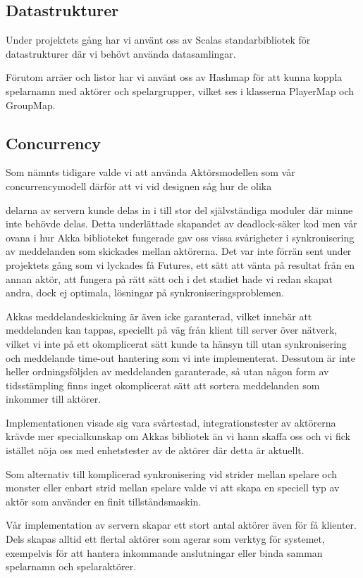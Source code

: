 \documentclass[a4paper]{article}
\begin{document}
\subsection{Datastrukturer}
Under projektets gång har vi använt oss av Scalas standarbibliotek för datastrukturer där vi behövt använda datasamlingar. 

Förutom arräer och listor har vi använt oss av Hashmap för att kunna koppla spelarnamn med aktörer och spelargrupper, vilket ses i klasserna
PlayerMap och GroupMap.

\subsection{Concurrency}
Som nämnts tidigare valde vi att använda Aktörsmodellen som vår concurrencymodell därför att vi vid designen såg hur de olika

delarna av servern kunde delas in i till stor del självständiga moduler där minne inte behövde delas. Detta underlättade
skapandet av deadlock-säker kod men vår ovana i hur Akka biblioteket fungerade gav oss vissa svårigheter i synkronisering av
meddelanden som skickades mellan aktörerna. Det var inte förrän sent under projektets gång som vi lyckades få Futures, ett sätt att 
vänta på resultat från en annan aktör, att fungera på rätt sätt och i det stadiet hade vi redan skapat andra, dock ej optimala,
lösningar på synkroniseringsproblemen. 

Akkas meddelandeskickning är även icke garanterad, vilket innebär att meddelanden kan
tappas, speciellt på väg från klient till server över nätverk, vilket vi inte på ett okomplicerat sätt kunde ta hänsyn till utan
synkronisering och meddelande time-out hantering som vi inte implementerat. Dessutom är inte heller ordningsföljden av meddelanden
garanterade, så utan någon form av tidsstämpling finns inget okomplicerat sätt att sortera meddelanden som inkommer till aktörer.

Implementationen visade sig vara svårtestad, integrationstester av aktörerna krävde mer specialkunskap om Akkas bibliotek än vi
hann skaffa oss och vi fick istället nöja oss med enhetstester av de aktörer där detta är aktuellt.

Som alternativ till komplicerad synkronisering vid strider mellan spelare och monster eller enbart strid mellan spelare valde vi att 
skapa en speciell typ av aktör som använder en finit tillståndsmaskin.

Vår implementation av servern skapar ett stort antal aktörer även för få klienter. Dels skapas alltid ett flertal aktörer som
agerar som verktyg för systemet, exempelvis för att hantera inkommande anslutningar eller binda samman spelarnamn och spelaraktörer.
\end{document}
